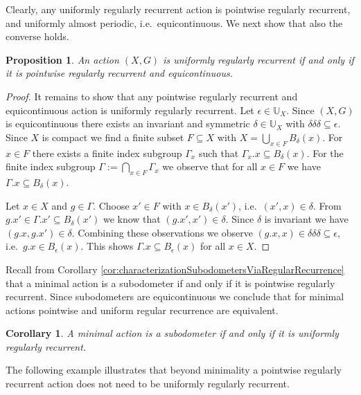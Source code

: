 \documentclass[12pt, reqno]{amsart}
\newtheorem{proposition}[theorem]{Proposition}
\newtheorem{corollary}[theorem]{Corollary}
\theoremstyle{definition}
\theoremstyle{remark}
\numberwithin{equation}{section}
\theoremstyle{theorem}
\theoremstyle{remark}
\begin{document}
Clearly, any uniformly regularly recurrent action is pointwise regularly recurrent, and uniformly almost periodic, i.e.\ equicontinuous. We next show that also the converse holds. 

\begin{proposition}
\label{pro:uniformRegularRecurrenceVSPointwiseRegularRecurrence}
    An action $(X,G)$ is uniformly regularly recurrent if and only if it is pointwise regularly recurrent and equicontinuous. 
\end{proposition}
\begin{proof}
    It remains to show that any pointwise regularly recurrent and equicontinuous action is uniformly regularly recurrent. 
    Let $\epsilon\in \mathbb{U}_X$. 
    Since $(X,G)$ is equicontinuous there exists an invariant and symmetric $\delta\in \mathbb{U}_X$ with $\delta\delta\delta\subseteq \epsilon$. 
    Since $X$ is compact we find a finite subset $F\subseteq X$ with $X=\bigcup_{x\in F}B_\delta(x)$. 
    For $x\in F$ there exists a finite index subgroup $\Gamma_x$ such that $\Gamma_x.x\subseteq B_\delta(x)$. 
    For the finite index subgroup $\Gamma:=\bigcap_{x\in F}\Gamma_x$ we observe that for all $x\in F$ we have $\Gamma.x\subseteq B_\delta(x)$. 

    Let $x\in X$ and $g\in \Gamma$. 
    Choose $x'\in F$ with $x\in B_\delta(x')$, i.e.\ $(x',x)\in \delta$. 
    From $g.x'\in \Gamma.x'\subseteq B_\delta(x')$ we know that $(g.x',x')\in \delta$. 
    Since $\delta$ is invariant we have $(g.x,g.x')\in \delta$. 
    Combining these observations we observe 
    $(g.x,x)\in \delta\delta\delta\subseteq \epsilon$, i.e.\ $g.x\in B_\epsilon(x)$. This shows $\Gamma.x\subseteq B_\epsilon(x)$ for all $x\in X$. 
\end{proof}

Recall from Corollary \ref{cor:characterizationSubodometersViaRegularRecurrence} that a minimal action is a subodometer if and only if it is pointwise regularly recurrent. 
Since subodometers are equicontinuous we conclude that for minimal actions pointwise and uniform regular recurrence are equivalent. 

\begin{corollary}
\label{cor:subodometersUniformlyRegularlyRecurrent}
    A minimal action is a subodometer if and only if it is uniformly regularly recurrent. 
\end{corollary}

The following example illustrates that beyond minimality a pointwise regularly recurrent action does not need to be uniformly regularly recurrent. 
\end{document}
